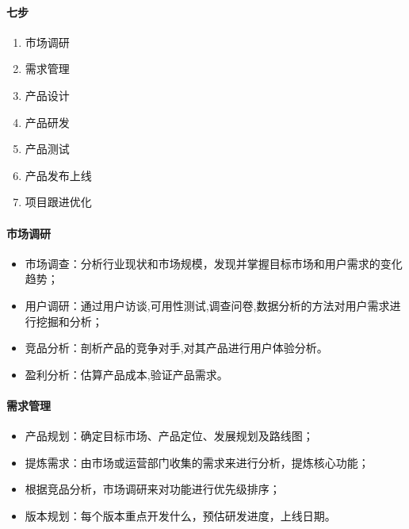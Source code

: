 \documentclass[letterpaper,11pt,english]{sphinxmanual}
\begin{document}
\paragraph{七步}
\label{\detokenize{chapter_project/process:id5}}\begin{enumerate}
%
\item {} 
市场调研

\item {} 
需求管理

\item {} 
产品设计

\item {} 
产品研发

\item {} 
产品测试

\item {} 
产品发布上线

\item {} 
项目跟进优化

\end{enumerate}


\paragraph{市场调研}
\label{\detokenize{chapter_project/process:id6}}\begin{itemize}
\item {} 
市场调查：分析行业现状和市场规模，发现并掌握目标市场和用户需求的变化趋势；

\item {} 
用户调研：通过用户访谈,可用性测试,调查问卷,数据分析的方法对用户需求进行挖掘和分析；

\item {} 
竞品分析：剖析产品的竞争对手,对其产品进行用户体验分析。

\item {} 
盈利分析：估算产品成本,验证产品需求。

\end{itemize}


\paragraph{需求管理}
\label{\detokenize{chapter_project/process:id7}}\begin{itemize}
\item {} 
产品规划：确定目标市场、产品定位、发展规划及路线图；

\item {} 
提炼需求：由市场或运营部门收集的需求来进行分析，提炼核心功能；

\item {} 
根据竞品分析，市场调研来对功能进行优先级排序；

\item {} 
版本规划：每个版本重点开发什么，预估研发进度，上线日期。

\end{itemize}
\end{document}
